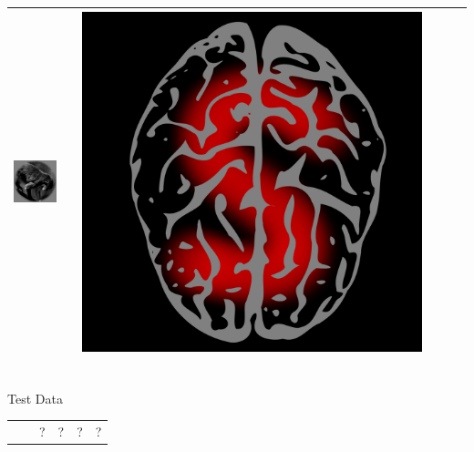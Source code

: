 \documentclass{beamer}
\begin{document}
\begin{frame}
\begin{center}
\begin{tabular}{ccc||ccc}
\includegraphics[scale = .26]{img4.png} & \hspace{0.2in} & \includegraphics[scale = 0.035]{brain5.png} \\ \hline
\end{tabular}\\
\vspace{0.1in}
Test Data \\
\begin{tabular}{c|c|cccc}
\hline
 & & ? & ? & ? & ? \\

\end{tabular}
\end{center}
\end{frame}
\end{document}
